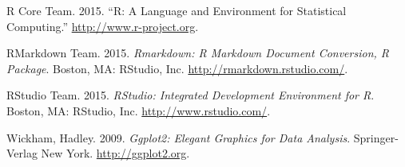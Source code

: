 \documentclass[
]{article}
\begin{document}
\hypertarget{refs}{}
\leavevmode\hypertarget{ref-RCoreTeam}{}%
R Core Team. 2015. ``R: A Language and Environment for Statistical
Computing.'' \url{http://www.r-project.org}.

\leavevmode\hypertarget{ref-RMarkdown}{}%
RMarkdown Team. 2015. \emph{Rmarkdown: R Markdown Document Conversion, R
Package}. Boston, MA: RStudio, Inc. \url{http://rmarkdown.rstudio.com/}.

\leavevmode\hypertarget{ref-RStudio}{}%
RStudio Team. 2015. \emph{RStudio: Integrated Development Environment
for R}. Boston, MA: RStudio, Inc. \url{http://www.rstudio.com/}.

\leavevmode\hypertarget{ref-ggplot}{}%
Wickham, Hadley. 2009. \emph{Ggplot2: Elegant Graphics for Data
Analysis}. Springer-Verlag New York. \url{http://ggplot2.org}.
\end{document}
